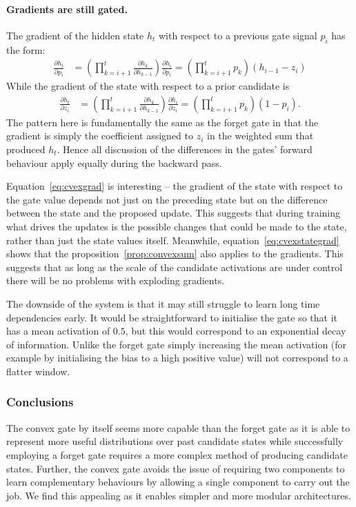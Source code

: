 \paragraph{Gradients are still gated.}
The gradient of the hidden state \(h_t\) with respect to a previous gate signal
\(p_i\) has the form:
\begin{align}
	\frac{\partial h_t}{\partial p_i} &= 
		\left(\prod_{k=i+1}^t \frac{\partial h_k}{\partial h_{k-1}}\right) 
			\frac{\partial h_i}{\partial p_i} 
	= \left( \prod_{k=i+1}^t p_k \right) (h_{i-1} - z_i) \label{eq:cvexgrad}
\end{align}
While the gradient of the state with respect to a prior candidate is
\begin{align}
	\frac{\partial h_t}{\partial z_i} &=
		\left(\prod_{k=i+1}^t \frac{\partial h_k}{\partial h_{k-1}}\right) 
			\frac{\partial h_i}{\partial z_i}
	= \left( \prod_{k=i+1}^t p_k \right) (1 - p_i). \label{eq:cvexstategrad}
\end{align} The pattern here is fundamentally the same as the forget gate in that the gradient
is simply the coefficient assigned to \(z_i\) in the weighted sum that produced \(h_t\). Hence
all discussion of the differences in the gates' forward behaviour apply equally during the
backward pass.

Equation~\eqref{eq:cvexgrad} is interesting -- the gradient of the state with respect to the gate value
depends not just on the preceding state but on the difference between the state and the proposed
update. This suggests that during training what drives the updates is the possible changes that could be
made to the state, rather than just the state values itself. Meanwhile, equation~\eqref{eq:cvexstategrad}
shows that the proposition~\ref{prop:convexsum} also applies to the gradients. 
This suggests that as long as the scale of the candidate activations are under control
there will be no problems with exploding gradients.

The downside of the system is that it may still struggle to learn long time dependencies early.
It would be straightforward to initialise the gate so that it has a mean activation of \(0.5\),
but this would correspond to an exponential decay of information. Unlike the forget gate simply
increasing the mean activation (for example by initialising the bias to a high positive value)
will not correspond to a flatter window.


\subsubsection{Conclusions}
The convex gate by itself seems more capable than the forget gate as it is able to represent more
useful distributions over past candidate states while successfully employing a forget gate requires a more
complex method of producing candidate states. Further, the convex gate avoids the issue of requiring
two components to learn complementary behaviours by allowing a single component to carry out the job.
We find this appealing as it enables simpler and more modular architectures.


